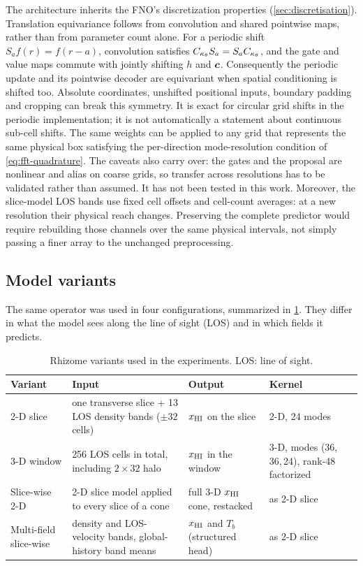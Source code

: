 The architecture inherits the FNO's discretization properties (\cref{sec:discretisation}). Translation equivariance follows from convolution and shared pointwise maps, rather than from parameter count alone. For a periodic shift $S_a f(r)=f(r-a)$, convolution satisfies $C_{\kappa_\theta} S_a=S_a C_{\kappa_\theta}$, and the gate and value maps commute with jointly shifting $h$ and $\bm{c}$. Consequently the periodic update and its pointwise decoder are equivariant when spatial conditioning is shifted too. Absolute coordinates, unshifted positional inputs, boundary padding and cropping can break this symmetry. It is exact for circular grid shifts in the periodic implementation; it is not automatically a statement about continuous sub-cell shifts. The same weights can be applied to any grid that represents the same physical box satisfying the per-direction mode-resolution condition of \cref{eq:fft-quadrature}. The caveats also carry over: the gates and the proposal are nonlinear and alias on coarse grids, so transfer across resolutions has to be validated rather than assumed. It has not been tested in this work. Moreover, the slice-model LOS bands use fixed cell offsets and cell-count averages: at a new resolution their physical reach changes. Preserving the complete predictor would require rebuilding those channels over the same physical intervals, not simply passing a finer array to the unchanged preprocessing.

\subsection{Model variants}
\label{sec:rhizome-variants}

The same operator was used in four configurations, summarized in \cref{tab:rhizome-variants}. They differ in what the model sees along the line of sight (LOS) and in which fields it predicts.

\begin{table}[!tp]
  \centering
  \caption{Rhizome variants used in the experiments. LOS: line of sight.}
  \label{tab:rhizome-variants}
  \small
  \begin{tabular}{@{}p{2.6cm}p{4.4cm}p{3.6cm}p{3.6cm}@{}}
    \toprule
    Variant & Input & Output & Kernel \\
    \midrule
    2-D slice
      & one transverse slice + 13 LOS density bands ($\pm32$ cells)
      & $x_{\mathrm{HI}}$ on the slice
      & 2-D, 24 modes \\
    3-D window
      & 256 LOS cells in total, including $2\times32$ halo
      & $x_{\mathrm{HI}}$ in the window
      & 3-D, modes (36,\,36,\,24), rank-48 factorized \\
    Slice-wise 2-D
      & 2-D slice model applied to every slice of a cone
      & full 3-D $x_{\mathrm{HI}}$ cone, restacked
      & as 2-D slice \\
    Multi-field slice-wise
      & density and LOS-velocity bands, global-history band means
      & $x_{\mathrm{HI}}$ and $T_b$ (structured head)
      & as 2-D slice \\
    \bottomrule
  \end{tabular}
\end{table}


